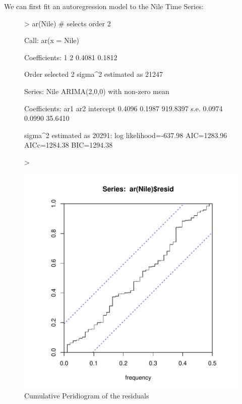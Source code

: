 \documentclass[11pt, a4paper]{article} %
\begin{document}
\noindent We can first fit an autoregression model to the Nile Time Series:
\begin{figure}
\centering
\begin{Schunk}
\begin{Sinput}
> ar(Nile) # selects order 2
\end{Sinput}
\begin{Soutput}
Call:
ar(x = Nile)

Coefficients:
     1       2  
0.4081  0.1812  

Order selected 2  sigma^2 estimated as  21247
\end{Soutput}
\begin{Soutput}
Series: Nile 
ARIMA(2,0,0) with non-zero mean 

Coefficients:
         ar1     ar2  intercept
      0.4096  0.1987   919.8397
s.e.  0.0974  0.0990    35.6410

sigma^2 estimated as 20291:  log likelihood=-637.98
AIC=1283.96   AICc=1284.38   BIC=1294.38
\end{Soutput}
\begin{Sinput}
> 
\end{Sinput}
\end{Schunk}
\includegraphics{alles-038}
\caption{Cumulative Peridiogram of the residuals}
\end{figure}
\end{document}
